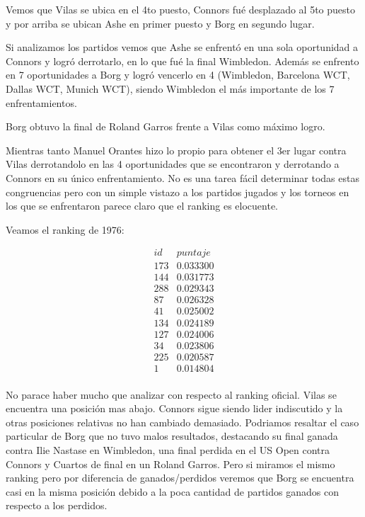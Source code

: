 Vemos que Vilas se ubica en el 4to puesto, Connors fué desplazado al 5to puesto y por arriba se ubican Ashe en primer puesto y Borg en segundo lugar. 

Si analizamos los partidos vemos que Ashe se enfrentó en una sola oportunidad a Connors y logró derrotarlo, en lo que fué la final Wimbledon. Además se enfrento en 7 oportunidades a Borg y logró vencerlo en 4 (Wimbledon, Barcelona WCT, Dallas WCT, Munich WCT), siendo Wimbledon el más importante de los 7 enfrentamientos.

Borg obtuvo la final de Roland Garros frente a Vilas como máximo logro. 

Mientras tanto Manuel Orantes hizo lo propio para obtener el 3er lugar contra Vilas derrotandolo en las 4 oportunidades que se encontraron y derrotando a Connors en su único enfrentamiento. 
No es una tarea fácil determinar todas estas congruencias pero con un simple vistazo a los partidos jugados y los torneos en los que se enfrentaron parece claro que el ranking es elocuente.

Veamos el ranking de 1976:

\begin{eqnarray*}
id & puntaje \\
173 & 0.033300 \\
144 & 0.031773 \\
288 & 0.029343 \\
87 & 0.026328 \\
41 & 0.025002 \\
134 & 0.024189 \\
127 & 0.024006 \\
34 & 0.023806 \\
225 & 0.020587 \\
1 & 0.014804 \\
\end{eqnarray*}

No parace haber mucho que analizar con respecto al ranking oficial. Vilas se encuentra una posición mas abajo. Connors sigue siendo lider indiscutido y la otras posiciones relativas no han cambiado demasiado. Podriamos resaltar el caso particular de Borg que no tuvo malos resultados, destacando su final ganada contra Ilie Nastase en Wimbledon, una final perdida en el US Open contra Connors y Cuartos de final en un Roland Garros. Pero si miramos el mismo ranking pero por diferencia de ganados/perdidos veremos que Borg se encuentra casi en la misma posición debido a la poca cantidad de partidos ganados con respecto a los perdidos. 

